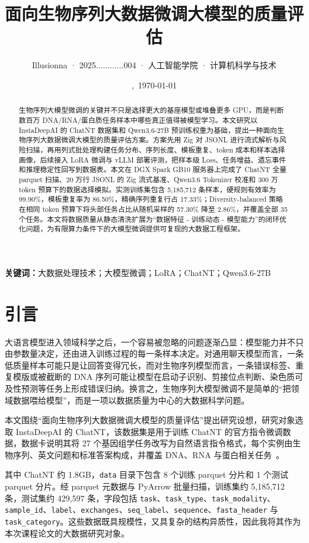 \documentclass{article}
\title{\vspace*{-3em}\textbf{面向生物序列大数据微调大模型的质量评估}}
\author{Illusionna · 2025............004 · 人工智能学院 · 计算机科学与技术}
\date{\currenttime,\ \today}
\begin{document}
\maketitle

\begin{abstract}\kaishu
    生物序列大模型微调的关键并不只是选择更大的基座模型或堆叠更多 GPU，而是判断数百万 DNA/RNA/蛋白质任务样本中哪些真正值得被模型学习。本文研究以 InstaDeepAI 的 ChatNT 数据集和 Qwen3.6-27B 预训练权重为基础，提出一种面向生物序列大数据微调大模型的质量评估方案。方案先用 Zig 对 JSONL 进行流式解析与风险扫描，再用列式批处理构建任务分布、序列长度、模板重复、token 成本和样本选择画像，后续接入 LoRA 微调与 vLLM 部署评测，把样本级 Loss、任务增益、遗忘事件和推理稳定性回写到数据表。本文在 DGX Spark GB10 服务器上完成了 ChatNT 全量 parquet 扫描、20 万行 JSONL 的 Zig 流式基准、Qwen3.6 Tokenizer 校准和 300 万 token 预算下的数据选择模拟。实测训练集包含 5,185,712 条样本，硬规则有效率为 99.90\%，模板重复率为 86.50\%，精确序列重复行占 17.33\%；Diversity-balanced 策略在相同 token 预算下将头部任务占比从随机采样的 57.30\% 降至 2.86\%，并覆盖全部 35 个任务。本文将数据质量从静态清洗扩展为“数据特征 - 训练动态 - 模型能力”的闭环优化问题，为有限算力条件下的大模型微调提供可复现的大数据工程框架。
\end{abstract}

\noindent\textbf{关键词：}大数据处理技术；大模型微调；LoRA；ChatNT；Qwen3.6-27B



\section{引言}
大语言模型进入领域科学之后，一个容易被忽略的问题逐渐凸显：模型能力并不只由参数量决定，还由进入训练过程的每一条样本决定。对通用聊天模型而言，一条低质量样本可能只是让回答变得冗长，而对生物序列模型而言，一条错误标签、重复模版或被截断的 DNA 序列可能让模型在启动子识别、剪接位点判断、染色质可及性预测等任务上形成错误归纳。换言之，生物序列大模型微调不是简单的“把领域数据喂给模型”，而是一项以数据质量为中心的大数据科学问题。

本文围绕“面向生物序列大数据微调大模型的质量评估”提出研究设想，研究对象选取 InstaDeepAI 的 ChatNT，该数据集是用于训练 ChatNT 的官方指令微调数据，数据卡说明其将 27 个基因组学任务改写为自然语言指令格式，每个实例由生物序列、英文问题和标准答案构成，并覆盖 DNA、RNA 与蛋白相关任务~\cite{chatnt_dataset}。

其中 ChatNT 约 1.8GB，\texttt{data} 目录下包含 8 个训练 parquet 分片和 1 个测试 parquet 分片。经 parquet 元数据与 PyArrow 批量扫描，训练集约 5,185,712 条，测试集约 429,597 条，字段包括 \texttt{task}、\texttt{task\_type}、\texttt{task\_modality}、\texttt{sample\_id}、\texttt{label}、\texttt{exchanges}、\texttt{seq\_label}、\texttt{sequence}、\texttt{fasta\_header} 与 \texttt{task\_category}。这些数据既具规模性，又具复杂的结构异质性，因此我将其作为本次课程论文的大数据研究对象。
\end{document}
